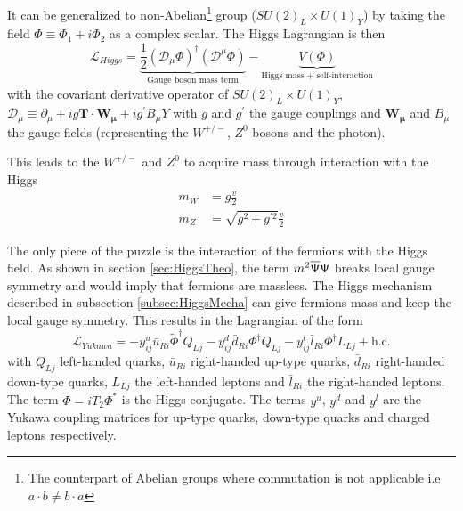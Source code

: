 It can be generalized to non-Abelian\footnote{The counterpart of Abelian groups where commutation is not applicable i.e $a \cdot b \neq b \cdot a$} group ($SU(2)_{L} \times U(1)_{Y}$) by taking the field $\Phi \equiv \Phi_1+i\Phi_2$ as a complex scalar. The Higgs Lagrangian is then
\begin{equation}
  \mathcal{L}_{Higgs} = \underbrace{\frac{1}{2}(\mathcal{D}_{\mu}\Phi)^{\dagger}(\mathcal{D}^{\mu}\Phi)}_{\text{Gauge boson mass term}} - \underbrace{V(\Phi)}_{\text{Higgs mass + self-interaction}}
\end{equation}
with the covariant derivative operator of $SU(2)_{L} \times U(1)_{Y}$, $\mathcal{D}_{\mu} \equiv \partial_{\mu} + ig\mathbf{T} \cdot \mathbf{W_{\mu}} + ig^{\prime} B_{\mu}Y$ with $g$ and $g^{\prime}$ the gauge couplings and $\mathbf{W_{\mu}}$ and $B_{\mu}$ the gauge fields (representing the $W^{+/-}$, $Z^0$ bosons and the photon).

This leads to the $W^{+/-}$ and $Z^0$ to acquire mass through interaction with the Higgs
\begin{equation}
  \begin{aligned}
    m_{W} &= g\frac{v}{2}\\
    m_{Z} &= \sqrt{g^2 + g^{\prime 2}}\frac{v}{2}
  \end{aligned}
\end{equation}

The only piece of the puzzle is the interaction of the fermions with the Higgs field. As shown in section \ref{sec:HiggsTheo}, the term $m^2\overline{\rm \Psi}\Psi$ breaks local gauge symmetry and would imply that fermions are massless. The Higgs mechanism described in subsection \ref{subsec:HiggsMecha} can give fermions mass and keep the local gauge symmetry. This results in the Lagrangian of the form \cite{ILC_TDR_Vol2}
\begin{equation}
  \mathcal{L}_{Yukawa} = - y^u_{ij}\bar{u}_{Ri}\widetilde{\Phi}^{\dagger}Q_{Lj} - y^d_{ij}\bar{d}_{Ri}\Phi^{\dagger}Q_{Lj} - y^l_{ij}\bar{l}_{Ri}\Phi^{\dagger}L_{Lj} + \text{h.c}.
\end{equation}
with $Q_{Lj}$ left-handed quarks, $\bar{u}_{Ri}$ right-handed up-type quarks, $\bar{d}_{Ri}$ right-handed down-type quarks, $L_{Lj}$ the left-handed leptons and $\bar{l}_{Ri}$ the right-handed leptons. The term $\widetilde{\Phi} = iT_2\Phi^{*}$ is the Higgs conjugate. The terms $y^u$, $y^d$ and $y^l$ are the Yukawa coupling matrices for up-type quarks, down-type quarks and charged leptons respectively.

